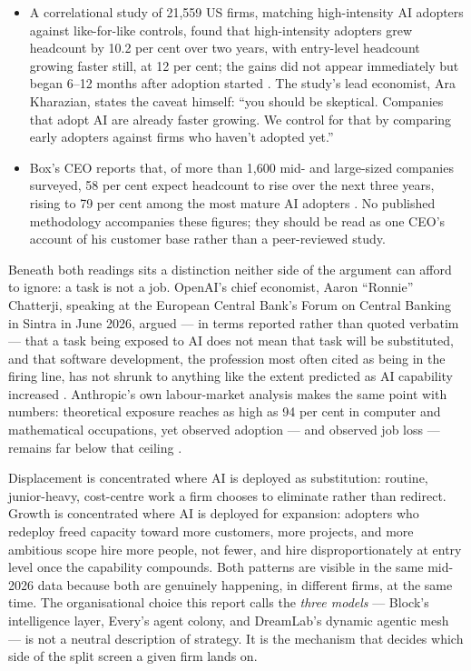 \begin{evidencebox}[title={Expansion Side: Where Adopters Are Hiring More}]
\begin{itemize}
  \item A correlational study of 21,559 US firms, matching high-intensity AI adopters against like-for-like controls, found that high-intensity adopters grew headcount by 10.2 per cent over two years, with entry-level headcount growing faster still, at 12 per cent; the gains did not appear immediately but began 6--12 months after adoption started \parencite{RampRevelio2026}. The study's lead economist, Ara Kharazian, states the caveat himself: ``you should be skeptical. Companies that adopt AI are already faster growing. We control for that by comparing early adopters against firms who haven't adopted yet.''
  \item Box's CEO reports that, of more than 1,600 mid- and large-sized companies surveyed, 58 per cent expect headcount to rise over the next three years, rising to 79 per cent among the most mature AI adopters \parencite{Levie2026}. No published methodology accompanies these figures; they should be read as one CEO's account of his customer base rather than a peer-reviewed study.
\end{itemize}
\end{evidencebox}

Beneath both readings sits a distinction neither side of the argument can afford to ignore: a task is not a job. OpenAI's chief economist, Aaron ``Ronnie'' Chatterji, speaking at the European Central Bank's Forum on Central Banking in Sintra in June 2026, argued --- in terms reported rather than quoted verbatim --- that a task being exposed to AI does not mean that task will be substituted, and that software development, the profession most often cited as being in the firing line, has not shrunk to anything like the extent predicted as AI capability increased \parencite{Chatterji2026}. Anthropic's own labour-market analysis makes the same point with numbers: theoretical exposure reaches as high as 94 per cent in computer and mathematical occupations, yet observed adoption --- and observed job loss --- remains far below that ceiling \parencite{AnthropicLabor2026}.

\begin{keyinsight}[title={The Split Screen Is a Distribution, Not a Contradiction}]
Displacement is concentrated where AI is deployed as substitution: routine, junior-heavy, cost-centre work a firm chooses to eliminate rather than redirect. Growth is concentrated where AI is deployed for expansion: adopters who redeploy freed capacity toward more customers, more projects, and more ambitious scope hire more people, not fewer, and hire disproportionately at entry level once the capability compounds. Both patterns are visible in the same mid-2026 data because both are genuinely happening, in different firms, at the same time. The organisational choice this report calls the \emph{three models} --- Block's intelligence layer, Every's agent colony, and DreamLab's dynamic agentic mesh --- is not a neutral description of strategy. It is the mechanism that decides which side of the split screen a given firm lands on.
\end{keyinsight}


